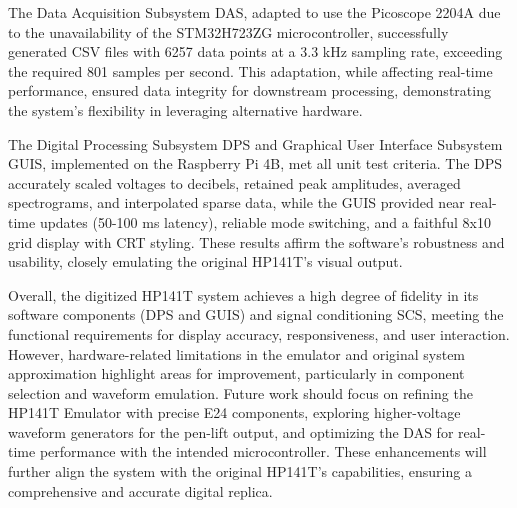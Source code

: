 \documentclass[class=report,11pt,crop=false]{standalone}
\begin{document}
The Data Acquisition Subsystem DAS, adapted to use the Picoscope 2204A due to the unavailability of the STM32H723ZG microcontroller, successfully generated CSV files with 6257 data points at a 3.3 kHz sampling rate, exceeding the required 801 samples per second. This adaptation, while affecting real-time performance, ensured data integrity for downstream processing, demonstrating the system's flexibility in leveraging alternative hardware.

The Digital Processing Subsystem DPS and Graphical User Interface Subsystem GUIS, implemented on the Raspberry Pi 4B, met all unit test criteria. The DPS accurately scaled voltages to decibels, retained peak amplitudes, averaged spectrograms, and interpolated sparse data, while the GUIS provided near real-time updates (50-100 ms latency), reliable mode switching, and a faithful 8x10 grid display with CRT styling. These results affirm the software's robustness and usability, closely emulating the original HP141T's visual output.

Overall, the digitized HP141T system achieves a high degree of fidelity in its software components (DPS and GUIS) and signal conditioning SCS, meeting the functional requirements for display accuracy, responsiveness, and user interaction. However, hardware-related limitations in the emulator and original system approximation highlight areas for improvement, particularly in component selection and waveform emulation. Future work should focus on refining the HP141T Emulator with precise E24 components, exploring higher-voltage waveform generators for the pen-lift output, and optimizing the DAS for real-time performance with the intended microcontroller. These enhancements will further align the system with the original HP141T's capabilities, ensuring a comprehensive and accurate digital replica.

\ifstandalone

\printnoidxglossary[type=\acronymtype,nonumberlist]
\fi
\end{document}
